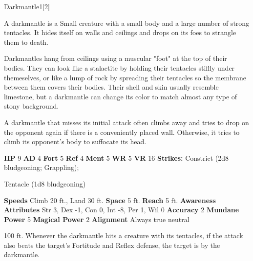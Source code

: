   \begin{monsection}{Darkmantle}{1}[2]
    \vspace{-1em}\vspace{-1em}
    \vspace{0em}

    
        A darkmantle is a Small creature with a small body and a large number of strong tentacles.
        It hides itself on walls and ceilings and drops on its foes to strangle them to death.
      
        Darkmantles hang from ceilings using a muscular "foot" at the top of their bodies.
        They can look like a stalactite by holding their tentacles stiffly under themeselves, or like a lump of rock by spreading their tentacles so the membrane between them covers their bodies.
        Their shell and skin usually resemble limestone, but a darkmantle can change its color to match almost any type of stony background.
      
        A darkmantle that misses its initial attack often climbs away and tries to drop on the opponent again if there is a conveniently placed wall.
        Otherwise, it tries to climb its opponent's body to suffocate its head.
      

    \begin{spellcontent}
      \begin{spelltargetinginfo}
        \pari \textbf{HP} 9 \monsep
          \textbf{AD} 4 \monsep
          \textbf{Fort} 5 \monsep
          \textbf{Ref} 4 \monsep
          \textbf{Ment} 5
        \pari \textbf{WR} 5 \monsep
        \textbf{VR} 16
        \pari \textbf{Strikes:}
            Constrict  (2d8 bludgeoning; Grappling);
\par Tentacle  (1d8 bludgeoning)
      \end{spelltargetinginfo}
    \end{spellcontent}
    \begin{monsterfooter}
      \pari \textbf{Speeds} Climb 20 ft., Land 30 ft. \monsep
        \textbf{Space} 5 ft. \monsep
        \textbf{Reach} 5 ft.
      \pari \textbf{Awareness} 
      \pari \textbf{Attributes}
        Str 3, Dex -1,
        Con 0, Int -8,
        Per 1, Wil 0
      \pari \textbf{Accuracy} 2 \monsep
        \textbf{Mundane Power} 5 \monsep
      \textbf{Magical Power} 2
      \pari \textbf{Alignment} Always true neutral
    \end{monsterfooter}
  \end{monsection}
   100 ft.
          Whenever the darkmantle hits a creature with its tentacles, if the attack also beats the target's Fortitude and Reflex defense,
          the target is  by the darkmantle.
  
